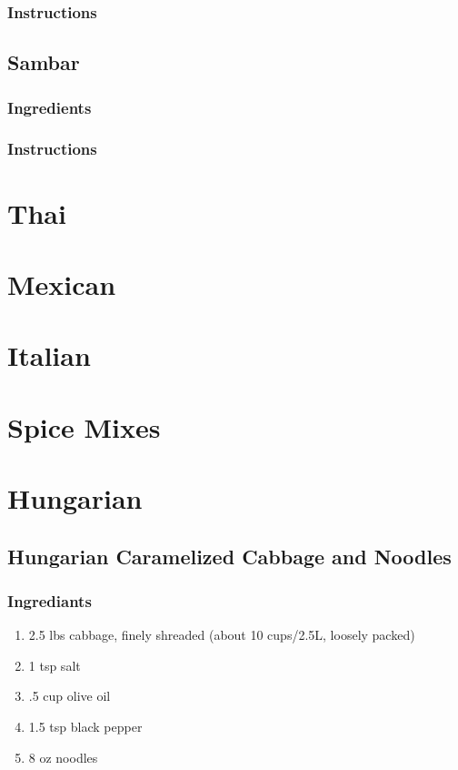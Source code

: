\documentclass[11pt]{article}
\begin{document}
\subsubsection*{Instructions}
\label{sec:orgc3501eb}
\subsection{Sambar}
\label{sec:orgaee17e6}
\subsubsection*{Ingredients}
\label{sec:org4d81e25}
\subsubsection*{Instructions}
\label{sec:org4e037ac}
\section{Thai}
\label{sec:org425bbd1}
\section{Mexican}
\label{sec:org99a29f5}
\section{Italian}
\label{sec:org16dc2bb}
\section{Spice Mixes}
\label{sec:org0a9e4de}
\section{Hungarian}
\label{sec:orgb4a07b7}
\subsection{Hungarian Caramelized Cabbage and Noodles}
\label{sec:org9e397e9}
\subsubsection*{Ingrediants}
\label{sec:org6fb5b22}
\begin{enumerate}
\item 2.5 lbs cabbage, finely shreaded (about 10 cups/2.5L, loosely packed)
\item 1 tsp salt
\item .5 cup olive oil
\item 1.5 tsp black pepper
\item 8 oz noodles
\end{enumerate}
\end{document}
